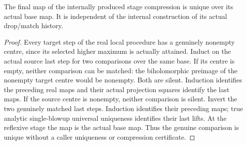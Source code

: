 \begin{lemma}
\label{hir:general-nc-open-unique-actual-comparison}
\leanok
The final map of the internally produced stage compression is unique over its
actual base map. It is independent of the internal construction of its actual
drop/match history.
\end{lemma}
\begin{proof}
Every target step of the real local procedure has a genuinely nonempty centre,
since its selected higher maximum is actually attained. Induct on the actual
source last step for two comparisons over the same base. If its centre is
empty, neither comparison can be matched: the biholomorphic preimage of the
nonempty target centre would be nonempty. Both are silent. Induction identifies
the preceding real maps and their actual projection squares identify the last
maps. If the source centre is nonempty, neither comparison is silent. Invert
the two genuinely matched last steps. Induction identifies their preceding
maps; true analytic single-blowup universal uniqueness identifies their last
lifts. At the reflexive stage the map is the actual base map. Thus the genuine
comparison is unique without a caller uniqueness or compression certificate.
\end{proof}

